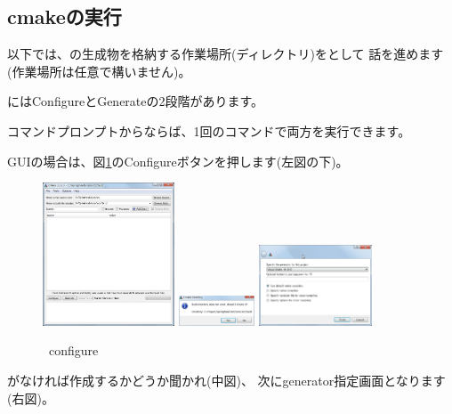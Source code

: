\subsection{cmakeの実行}
\label{subsec:CmakeLibrary}

\noindent
以下では、\cmake の生成物を格納する作業場所(ディレクトリ)を\build として
話を進めます(作業場所は任意で構いません)。

\medskip
\cmake にはConfigureとGenerateの2段階があります。

\medskip
\begin{narrow}[15pt]
	コマンドプロンプトからならば、1回のコマンドで両方を実行できます。

	\bigskip
	GUIの場合は、図\ref{fig:CmakeConfigure}のConfigureボタンを押します(左図の下)。

	\begin{figure}[h]
	\begin{center}
	\includegraphics[width=0.35\textwidth]{fig/CmakeConfigure1.eps}
	\includegraphics[width=0.2\textwidth]{fig/CmakeConfigure2.eps}
	\includegraphics[width=0.3\textwidth]{fig/CmakeConfigure3.eps}
	\end{center}
	\caption{\cmake\ configure}
	\label{fig:CmakeConfigure}
	\end{figure}

	\build がなければ作成するかどうか聞かれ(中図)、
	次にgenerator指定画面となります(右図)。


\end{narrow}
